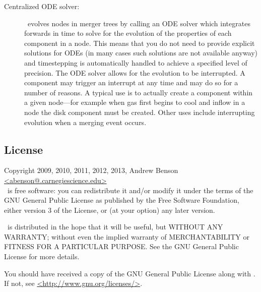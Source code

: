 \begin{description}
 \item [Centralized ODE solver:] \glc\ evolves nodes in merger trees by calling an ODE solver which integrates forwards in time to solve for the evolution of the properties of each component in a node. This means that you do not need to provide explicit solutions for ODEs (in many cases such solutions are not available anyway) and timestepping is automatically handled to achieve a specified level of precision. The ODE solver allows for the evolution to be interrupted. A component may trigger an interrupt at any time and may do so for a number of reasons. A typical use is to actually create a component within a given node---for example when gas first begins to cool and inflow in a node the disk component must be created. Other uses include interrupting evolution when a merging event occurs.
\end{description}

\subsection{License}

Copyright 2009, 2010, 2011, 2012, 2013, Andrew Benson \href{mailto:abenson@.carnegiescience.edu}{\normalfont \ttfamily <abenson@.carnegiescience.edu>}\\

\glc\ is free software: you can redistribute it and/or modify
it under the terms of the GNU General Public License as published by
the Free Software Foundation, either version 3 of the License, or
(at your option) any later version.

\glc\ is distributed in the hope that it will be useful,
but WITHOUT ANY WARRANTY; without even the implied warranty of
MERCHANTABILITY or FITNESS FOR A PARTICULAR PURPOSE.  See the
GNU General Public License for more details.

You should have received a copy of the GNU General Public License
along with \glc.  If not, see \href{http://www.gnu.org/licenses/}{\normalfont \ttfamily <http://www.gnu.org/licenses/>}.
